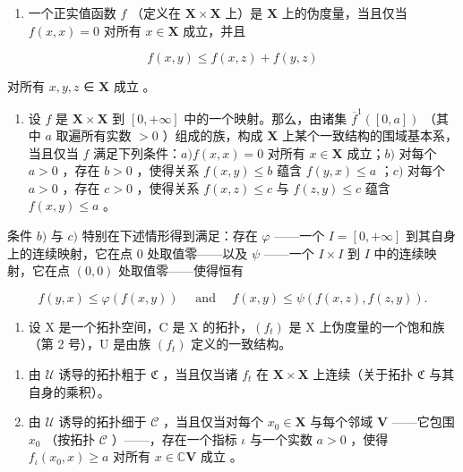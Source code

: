 \ExerciseGroupsStart
\ExerciseSection

\begin{enumerate}
\def\labelenumi{\arabic{enumi})}
\tightlist
\item
  一个正实值函数 \(f\) （定义在 \(\mathbf{X} \times \mathbf{X}\) 上）是 \(\mathbf{X}\) 上的伪度量，当且仅当 \(f(x, x) = 0\) 对所有 \(x \in \mathbf{X}\) 成立，并且
\end{enumerate}

\[
f (x, y) \leqslant f (x, z) + f (y, z)
\]

对所有 \(x, y, z\) ∈ \(\mathbf{X}\) 成立 。

\begin{enumerate}
\def\labelenumi{\arabic{enumi})}
\setcounter{enumi}{1}
\tightlist
\item
  设 \(f\) 是 \(\mathbf{X} \times \mathbf{X}\) 到 \([0, +\infty]\) 中的一个映射。那么，由诸集 \(\overline{f}^{1}([0, a])\) （其中 \(a\) 取遍所有实数 \(>0\) ）组成的族，构成 \(\mathbf{X}\) 上某个一致结构的围域基本系，当且仅当 \(f\) 满足下列条件：\(a) f(x, x) = 0\) 对所有 \(x \in \mathbf{X}\) 成立；\(b)\) 对每个 \(a > 0\) ，存在 \(b > 0\) ，使得关系 \(f(x, y) \leqslant b\) 蕴含 \(f(y, x) \leqslant a\) ；\(c)\) 对每个 \(a > 0\) ，存在 \(c > 0\) ，使得关系 \(f(x, z) \leqslant c\) 与 \(f(z, y) \leqslant c\) 蕴含 \(f(x, y) \leqslant a\) 。
\end{enumerate}

条件 \(b)\) 与 \(c)\) 特别在下述情形得到满足：存在 \(\varphi\) ——一个 \(I = [0, +\infty]\) 到其自身上的连续映射，它在点 \(0\) 处取值零——以及 \(\psi\) ——一个 \(I \times I\) 到 \(I\) 中的连续映射，它在点 \((0, 0)\) 处取值零——使得恒有

\[
f (y, x) \leqslant \varphi (f (x, y)) \quad \text { and } \quad f (x, y) \leqslant \psi (f (x, z), f (z, y)).
\]

\begin{enumerate}
\def\labelenumi{\arabic{enumi})}
\setcounter{enumi}{2}
\tightlist
\item
  设 X 是一个拓扑空间，C 是 X 的拓扑，\((f_{t})\) 是 X 上伪度量的一个饱和族（第 2 号），U 是由族 \((f_{t})\) 定义的一致结构。
\end{enumerate}

\begin{enumerate}
\def\labelenumi{\alph{enumi})}
\item
  由 \(\mathcal{U}\) 诱导的拓扑粗于 \(\mathfrak{C}\) ，当且仅当诸 \(f_{t}\) 在 \(\mathbf{X} \times \mathbf{X}\) 上连续（关于拓扑 \(\mathfrak{C}\) 与其自身的乘积）。
\item
  由 \(\mathcal{U}\) 诱导的拓扑细于 \(\mathcal{C}\) ，当且仅当对每个 \(x_0 \in \mathbf{X}\) 与每个邻域 \(\mathbf{V}\) ——它包围 \(x_0\) （按拓扑 \(\mathcal{C}\) ）——，存在一个指标 \(\iota\) 与一个实数 \(a > 0\) ，使得 \(f_{\iota}(x_0, x) \geqslant a\) 对所有 \(x \in \mathbb{C}\mathbf{V}\) 成立 。
\end{enumerate}

